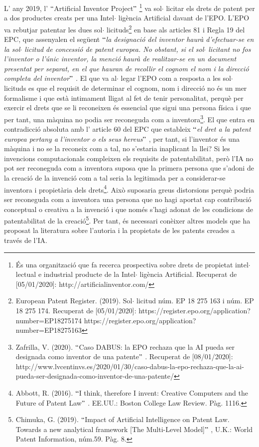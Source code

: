 \documentclass[12pt]{article}
\begin{document}
\vspace{\baselineskip}
\begin{justify}
L’ any 2019, l’ $``$Artificial Inventor Project$"$  \footnote{ És una organització que fa recerca prospectiva sobre drets de propietat intel$ \cdot $ lectual e industrial producte de la Intel$ \cdot $ ligència Artificial. Recuperat de [05/01/2020]: http://artificialinventor.com/ } va sol$ \cdot $ licitar els drets de patent per a dos productes creats per una Intel$ \cdot $ ligència Artificial davant de l’EPO. L’EPO va rebutjar patentar les dues sol$ \cdot $ licituds\footnote{ European Patent Register. (2019). Sol$ \cdot $ licitud núm. EP 18 275 163 i núm. EP 18 275 174. Recuperat de [05/01/2020]: https://register.epo.org/application?number=EP18275174 https://register.epo.org/application?number=EP18275163 } en base als articles 81 i Regla 19 del EPC, que assenyalen el següent $``$\textit{la designació del inventor haurà d’efectuar-se en la sol$ \cdot $ licitud de concessió de patent europea. No obstant, si el sol$ \cdot $ licitant no fos l’inventor o l’únic inventor, la menció haurà de realitzar-se en un document presentat per separat, en el que hauran de recollir el cognom el nom i la direcció completa del inventor$"$ . }El que va al$ \cdot $ legar l’EPO com a resposta a les sol$ \cdot $ licituds es que el requisit de determinar el cognom, nom i direcció no és un mer formalisme i que està intimament lligat al fet de tenir personalitat, perquè per exercir el drets que se li reconeixen és essencial que sigui una persona física i que per tant, una màquina no podia ser reconeguda com a inventora\footnote{ Zafrilla, V. (2020). $``$Caso DABUS: la EPO rechaza que la AI pueda ser designada como inventor de una patente$"$ . Recuperat de [08/01/2020]: http://www.lvcentinvs.es/2020/01/30/caso-dabus-la-epo-rechaza-que-la-ai-pueda-ser-designada-como-inventor-de-una-patente/ }. El que entra en contradicció absoluta amb l’ article 60 del EPC que estableix $``$\textit{el dret a la patent europea pertany a l’inventor o els seus hereus$"$ }, per tant, si l’inventor és una màquina i no se la reconeix com a tal, no s’estaria inaplicant la llei? Si les invencions computacionals compleixen els requisits de patentabilitat, però l’IA no pot ser reconeguda com a inventora suposa que la primera persona que s’adoni de la creació de la invenció com a tal seria la legitimada per a considerar-se inventora i propietària dels drets\footnote{ Abbott, R. (2016). $``$I think, therefore I invent: Creative Computers and the Future of Patent Law$"$ . EE.UU.: Boston College Law Review. Pàg. 1116. }. Això suposaria greus distorsions perquè podria ser reconeguda com a inventora una persona que no hagi aportat cap contribució conceptual o creativa a la invenció i que només s’hagi adonat de les condicions de patentabilitat de la creació\footnote{ Chimuka, G. (2019). $``$Impact of Artificial Intelligence on Patent Law. Towards a new analytical framework [The Multi-Level Model]$"$ , U.K.: World Patent Information, núm.59. Pàg. 8. }. Per tant, és necessari conèixer altres models que ha proposat la literatura sobre l’autoria i la propietats de les patents creades a través de l’IA. 
\end{justify}\par
\end{document}
